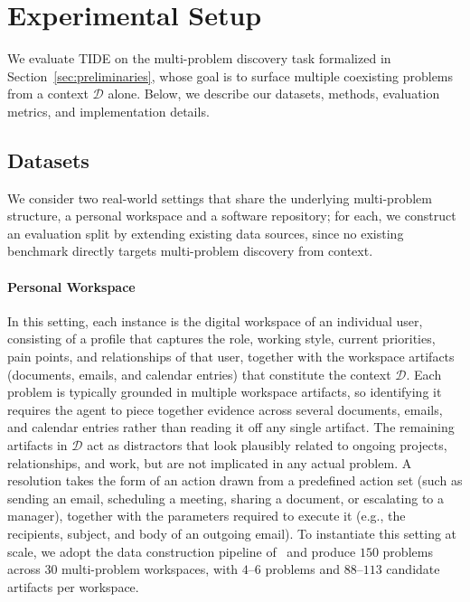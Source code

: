 \section{Experimental Setup}
\label{sec:experimental_setup}
We evaluate \textsc{TIDE} on the multi-problem discovery task formalized in Section~\ref{sec:preliminaries}, whose goal is to surface multiple coexisting problems from a context $\mathcal{D}$ alone. Below, we describe our datasets, methods, evaluation metrics, and implementation details.

\subsection{Datasets}
We consider two real-world settings that share the underlying multi-problem structure, a personal workspace and a software repository; for each, we construct an evaluation split by extending existing data sources, since no existing benchmark directly targets multi-problem discovery from context.

\paragraph{Personal Workspace}
In this setting, each instance is the digital workspace of an individual user, consisting of a profile that captures the role, working style, current priorities, pain points, and relationships of that user, together with the workspace artifacts (documents, emails, and calendar entries) that constitute the context $\mathcal{D}$. Each problem is typically grounded in multiple workspace artifacts, so identifying it requires the agent to piece together evidence across several documents, emails, and calendar entries rather than reading it off any single artifact. The remaining artifacts in $\mathcal{D}$ act as distractors that look plausibly related to ongoing projects, relationships, and work, but are not implicated in any actual problem. A resolution takes the form of an action drawn from a predefined action set (such as sending an email, scheduling a meeting, sharing a document, or escalating to a manager), together with the parameters required to execute it (e.g., the recipients, subject, and body of an outgoing email). To instantiate this setting at scale, we adopt the data construction pipeline of~\citet{probe} and produce $150$ problems across $30$ multi-problem workspaces, with $4$--$6$ problems and $88$--$113$ candidate artifacts per workspace.

